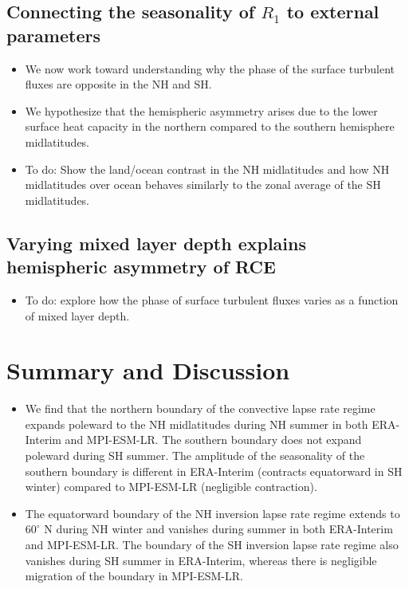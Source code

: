 \documentclass{ametsocV5}
\begin{document}
\subsection{Connecting the seasonality of \(R_{1}\) to external parameters}
\begin{itemize}
  \item We now work toward understanding why the phase of the surface turbulent fluxes are opposite in the NH and SH.
  \item We hypothesize that the hemispheric asymmetry arises due to the lower surface heat capacity in the northern compared to the southern hemisphere midlatitudes.
  \item To do: Show the land/ocean contrast in the NH midlatitudes and how NH midlatitudes over ocean behaves similarly to the zonal average of the SH midlatitudes.
\end{itemize}

\subsection{Varying mixed layer depth explains hemispheric asymmetry of RCE}
\begin{itemize}
        \item To do: explore how the phase of surface turbulent fluxes varies as a function of mixed layer depth.
\end{itemize}

\section{Summary and Discussion}
\begin{itemize}
  \item We find that the northern boundary of the convective lapse rate regime expands poleward to the NH midlatitudes during NH summer in both ERA-Interim and MPI-ESM-LR. The southern boundary does not expand poleward during SH summer. The amplitude of the seasonality of the southern boundary is different in ERA-Interim (contracts equatorward in SH winter) compared to MPI-ESM-LR (negligible contraction).
  \item The equatorward boundary of the NH inversion lapse rate regime extends to \(60^{\circ}\) N during NH winter and vanishes during summer in both ERA-Interim and MPI-ESM-LR. The boundary of the SH inversion lapse rate regime also vanishes during SH summer in ERA-Interim, whereas there is negligible migration of the boundary in MPI-ESM-LR.

\end{itemize}
\end{document}
